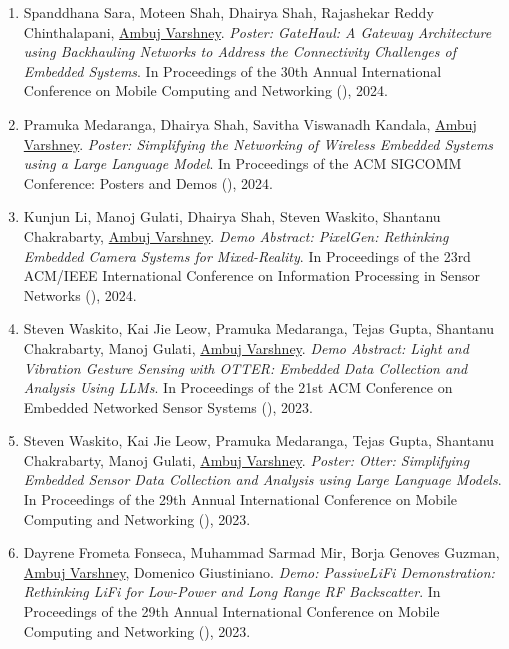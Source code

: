\begin{enumerate}
\item Spanddhana Sara\pg, Moteen Shah\ug, Dhairya Shah\phd, Rajashekar Reddy Chinthalapani\phd, \underline{Ambuj Varshney}. 
\emph{Poster: GateHaul: A Gateway Architecture using Backhauling Networks to Address the Connectivity Challenges of Embedded Systems}. 
In Proceedings of the 30th Annual International Conference on Mobile Computing and Networking (), 2024.

\item Pramuka Medaranga\phd, Dhairya Shah\phd, Savitha Viswanadh Kandala\phd, \underline{Ambuj Varshney}. 
\emph{Poster: Simplifying the Networking of Wireless Embedded Systems using a Large Language Model}. 
In Proceedings of the ACM SIGCOMM Conference: Posters and Demos (), 2024.

\item Kunjun Li\ug, Manoj Gulati\postdoc, Dhairya Shah\phd, Steven Waskito\ug, Shantanu Chakrabarty, \underline{Ambuj Varshney}. 
\emph{Demo Abstract: PixelGen: Rethinking Embedded Camera Systems for Mixed-Reality}. 
In Proceedings of the 23rd ACM/IEEE International Conference on Information Processing in Sensor Networks (), 2024.


\item Steven Waskito\ug, Kai Jie Leow\ug, Pramuka Medaranga\phd, Tejas Gupta\ug, Shantanu Chakrabarty, Manoj Gulati\postdoc, \underline{Ambuj Varshney}. 
\emph{Demo Abstract: Light and Vibration Gesture Sensing with OTTER: Embedded Data Collection and Analysis Using LLMs}. 
In Proceedings of the 21st ACM Conference on Embedded Networked Sensor Systems (), 2023.

\item Steven Waskito\ug, Kai Jie Leow\ug, Pramuka Medaranga\phd, Tejas Gupta\ug, Shantanu Chakrabarty, Manoj Gulati\postdoc, \underline{Ambuj Varshney}. 
\emph{Poster: Otter: Simplifying Embedded Sensor Data Collection and Analysis using Large Language Models}. 
In Proceedings of the 29th Annual International Conference on Mobile Computing and Networking (), 2023.

\item Dayrene Frometa Fonseca, Muhammad Sarmad Mir, Borja Genoves Guzman, \underline{Ambuj Varshney}, Domenico Giustiniano. 
\emph{Demo: PassiveLiFi Demonstration: Rethinking LiFi for Low-Power and Long Range RF Backscatter}. 
In Proceedings of the 29th Annual International Conference on Mobile Computing and Networking (), 2023.


\end{enumerate}

